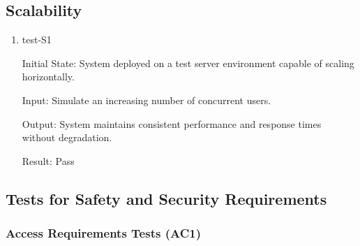 \documentclass[12pt, titlepage]{article}
\begin{document}
\subsection{Scalability} \label{section:4.9}

\begin{enumerate}
\item test-S1 \label{test-S1}

Initial State: System deployed on a test server environment capable of scaling horizontally.

Input: Simulate an increasing number of concurrent users.

Output: System maintains consistent performance and response times without degradation.

Result: Pass

\end{enumerate}

\subsection{Tests for Safety and Security Requirements} \label{section:4.10}

\subsubsection{Access Requirements Tests (AC1)} \label{section:4.10.1}
\end{document}
